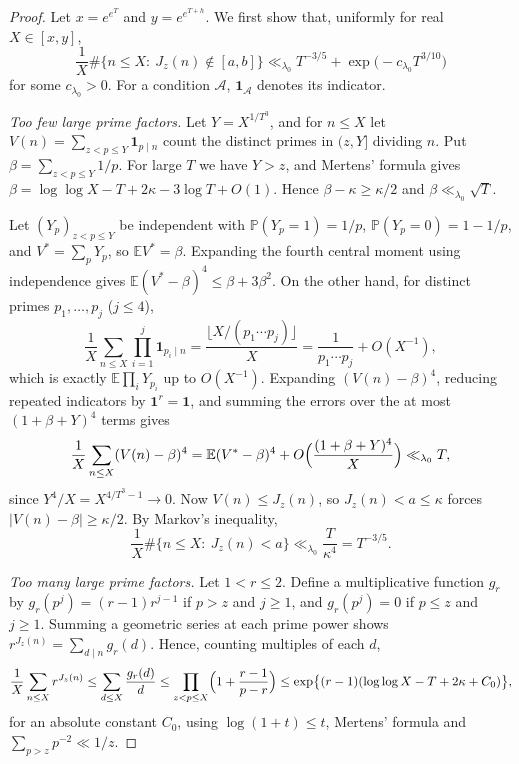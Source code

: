 \documentclass[11pt,a4paper]{article}
\numberwithin{equation}{section}
\theoremstyle{plain}
\theoremstyle{definition}
\theoremstyle{remark}
\newcommand{\PP}{\mathbb{P}}
\newcommand{\EE}{\mathbb{E}}
\newcommand{\one}{\mathbf{1}}
\begin{document}
\begin{proof}
Let $x=e^{e^T}$ and $y=e^{e^{T+h}}$. We first show that, uniformly for real $X\in[x,y]$,
\begin{equation}\label{eq:density}
\frac1X\#\{n\le X:\ J_z(n)\notin[a,b]\}\ll_{\lambda_0}T^{-3/5}+\exp\bigl(-c_{\lambda_0}T^{3/10}\bigr)
\end{equation}
for some $c_{\lambda_0}>0$. For a condition $\mathcal A$, $\one_{\mathcal A}$ denotes its indicator.

\emph{Too few large prime factors.} Let $Y=X^{1/T^3}$, and for $n\le X$ let $V(n)=\sum_{z<p\le Y}\one_{p\mid n}$ count the distinct primes in $(z,Y]$ dividing $n$. Put $\beta=\sum_{z<p\le Y}1/p$. For large $T$ we have $Y>z$, and Mertens' formula gives $\beta=\log\log X-T+2\kappa-3\log T+O(1)$. Hence $\beta-\kappa\ge\kappa/2$ and $\beta\ll_{\lambda_0}\sqrt T$.

Let $(Y_p)_{z<p\le Y}$ be independent with $\PP(Y_p=1)=1/p$, $\PP(Y_p=0)=1-1/p$, and $V^*=\sum_pY_p$, so $\EE V^*=\beta$. Expanding the fourth central moment using independence gives $\EE(V^*-\beta)^4\le\beta+3\beta^2$. On the other hand, for distinct primes $p_1,\dots,p_j$ ($j\le4$),
\[
\frac1X\sum_{n\le X}\prod_{i=1}^j\one_{p_i\mid n}=\frac{\lfloor X/(p_1\cdots p_j)\rfloor}{X}=\frac{1}{p_1\cdots p_j}+O(X^{-1}),
\]
which is exactly $\EE\prod_iY_{p_i}$ up to $O(X^{-1})$. Expanding $(V(n)-\beta)^4$, reducing repeated indicators by $\one^r=\one$, and summing the errors over the at most $(1+\beta+Y)^4$ terms gives
\[
\frac1X\sum_{n\le X}(V(n)-\beta)^4=\EE(V^*-\beta)^4+O\Bigl(\frac{(1+\beta+Y)^4}{X}\Bigr)\ll_{\lambda_0}T,
\]
since $Y^4/X=X^{4/T^3-1}\to0$. Now $V(n)\le J_z(n)$, so $J_z(n)<a\le\kappa$ forces $|V(n)-\beta|\ge\kappa/2$. By Markov's inequality,
\begin{equation}\label{eq:lowertail}
\frac1X\#\{n\le X:\ J_z(n)<a\}\ll_{\lambda_0}\frac{T}{\kappa^4}=T^{-3/5}.
\end{equation}

\emph{Too many large prime factors.} Let $1<r\le2$. Define a multiplicative function $g_r$ by $g_r(p^j)=(r-1)r^{j-1}$ if $p>z$ and $j\ge1$, and $g_r(p^j)=0$ if $p\le z$ and $j\ge1$. Summing a geometric series at each prime power shows $r^{J_z(n)}=\sum_{d\mid n}g_r(d)$. Hence, counting multiples of each $d$,
\[
\frac1X\sum_{n\le X}r^{J_z(n)}\le\sum_{d\le X}\frac{g_r(d)}{d}\le\prod_{z<p\le X}\Bigl(1+\frac{r-1}{p-r}\Bigr)\le\exp\bigl\{(r-1)(\log\log X-T+2\kappa+C_0)\bigr\},
\]
for an absolute constant $C_0$, using $\log(1+t)\le t$, Mertens' formula and $\sum_{p>z}p^{-2}\ll1/z$.


\end{proof}
\end{document}
